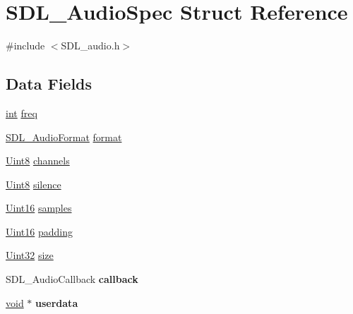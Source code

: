 \hypertarget{struct_s_d_l___audio_spec}{}\section{S\+D\+L\+\_\+\+Audio\+Spec Struct Reference}
\label{struct_s_d_l___audio_spec}


{\ttfamily \#include $<$S\+D\+L\+\_\+audio.\+h$>$}

\subsection*{Data Fields}
\begin{DoxyCompactItemize}
\item 
\hyperlink{_s_d_l__thread_8h_a6a64f9be4433e4de6e2f2f548cf3c08e}{int} \hyperlink{struct_s_d_l___audio_spec_ae0d22272b68e75d19ac0b80c01f806b6}{freq}
\item 
\hyperlink{_s_d_l__audio_8h_a491ed103fd25d920c4e6b7495217ce66}{S\+D\+L\+\_\+\+Audio\+Format} \hyperlink{struct_s_d_l___audio_spec_ab7e71a641a48b8199ef79f8c7f41af61}{format}
\item 
\hyperlink{_s_d_l__stdinc_8h_a2944638813a090aa23e62f4da842c3e2}{Uint8} \hyperlink{struct_s_d_l___audio_spec_a2a6435e054f3ee99cbef44344bf83289}{channels}
\item 
\hyperlink{_s_d_l__stdinc_8h_a2944638813a090aa23e62f4da842c3e2}{Uint8} \hyperlink{struct_s_d_l___audio_spec_a9f3aae8ba0a529c3652087cb49ce6d11}{silence}
\item 
\hyperlink{_s_d_l__stdinc_8h_a31fcc0a076c9068668173ee26d33e42b}{Uint16} \hyperlink{struct_s_d_l___audio_spec_afe09cc5fd2bca18a01641bc94ff31b2c}{samples}
\item 
\hyperlink{_s_d_l__stdinc_8h_a31fcc0a076c9068668173ee26d33e42b}{Uint16} \hyperlink{struct_s_d_l___audio_spec_a489489d55916facdcdfcc2f20fe18309}{padding}
\item 
\hyperlink{_s_d_l__stdinc_8h_add440eff171ea5f55cb00c4a9ab8672d}{Uint32} \hyperlink{struct_s_d_l___audio_spec_a1338cce8a57eea552ed3ed77e28af0c0}{size}
\item 
S\+D\+L\+\_\+\+Audio\+Callback {\bfseries callback}\hypertarget{struct_s_d_l___audio_spec_ab354de581da426745dcf6bcbc9ae03c2}{}\label{struct_s_d_l___audio_spec_ab354de581da426745dcf6bcbc9ae03c2}

\item 
\hyperlink{_s_d_l__audio_8h_a52835ae37c4bb905b903cbaf5d04b05f}{void} $\ast$ {\bfseries userdata}\hypertarget{struct_s_d_l___audio_spec_afd0ffb02780e738d4c0a10ab833b7834}{}\label{struct_s_d_l___audio_spec_afd0ffb02780e738d4c0a10ab833b7834}

\end{DoxyCompactItemize}


